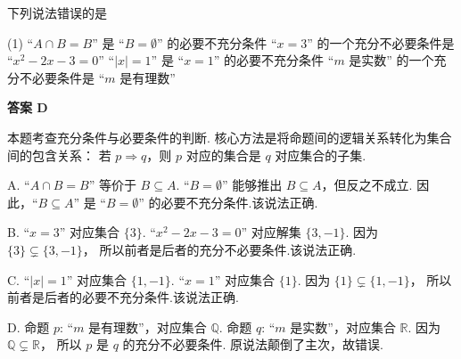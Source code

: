 \begin{choice}[source={2023 秋 · 高一 · 山东烟台 · 月考校考}, topic={充分必要条件}]
下列说法错误的是
\begin{tasks}(1)
	\task ``$A \cap B = B$'' 是 ``$B = \emptyset$'' 的必要不充分条件
	\task ``$x=3$'' 的一个充分不必要条件是 ``$x^2-2x-3=0$''
	\task ``$\lvert x\rvert=1$'' 是 ``$x=1$'' 的必要不充分条件
	\task ``$m$ 是实数'' 的一个充分不必要条件是 ``$m$ 是有理数''
\end{tasks}
\end{choice}
\begin{choice-sol}
\textbf{答案 D}

本题考查充分条件与必要条件的判断.
核心方法是将命题间的逻辑关系转化为集合间的包含关系：
若 $p \Rightarrow q$，则 $p$ 对应的集合是 $q$ 对应集合的子集.

A. ``$A \cap B = B$'' 等价于 $B \subseteq A$.
``$B=\emptyset$'' 能够推出 $B \subseteq A$，但反之不成立.
因此，``$B \subseteq A$'' 是 ``$B=\emptyset$'' 的必要不充分条件.该说法正确.

B. ``$x=3$'' 对应集合 $\{3\}$.
``$x^2-2x-3=0$'' 对应解集 $\{3, -1\}$.
因为 $\{3\} \subsetneq \{3, -1\}$，
所以前者是后者的充分不必要条件.该说法正确.

C. ``$\lvert x\rvert=1$'' 对应集合 $\{1, -1\}$.
``$x=1$'' 对应集合 $\{1\}$.
因为 $\{1\} \subsetneq \{1, -1\}$，
所以前者是后者的必要不充分条件.该说法正确.

D. 命题 $p$: ``$m$ 是有理数''，对应集合 $\mathbb{Q}$.
命题 $q$: ``$m$ 是实数''，对应集合 $\mathbb{R}$.
因为 $\mathbb{Q} \subsetneq \mathbb{R}$，
所以 $p$ 是 $q$ 的充分不必要条件.
原说法颠倒了主次，故错误.
\end{choice-sol}
